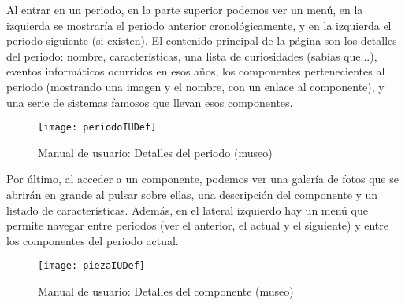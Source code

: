 Al entrar en un periodo, en la parte superior podemos ver un menú, en la izquierda se mostraría el periodo anterior cronológicamente, y en la izquierda el periodo siguiente (si existen). El contenido principal de la página son los detalles del periodo: nombre, características, una lista de curiosidades (sabías que...), eventos informáticos ocurridos en esos años, los componentes pertenecientes al periodo (mostrando una imagen y el nombre, con un enlace al componente), y una serie de sistemas famosos que llevan esos componentes. 
\begin{figure}[H]
\centering
\texttt{[image: periodoIUDef]}
\caption{Manual de usuario: Detalles del periodo (museo)}
\end{figure}
Por último, al acceder a un componente, podemos ver una galería de fotos que se abrirán en grande al pulsar sobre ellas, una descripción del componente y un listado de características. Además, en el lateral izquierdo hay un menú que permite navegar entre periodos (ver el anterior, el actual y el siguiente) y entre los componentes del periodo actual.
\begin{figure}[H]
\centering
\texttt{[image: piezaIUDef]}
\caption{Manual de usuario: Detalles del componente (museo)}
\end{figure}

